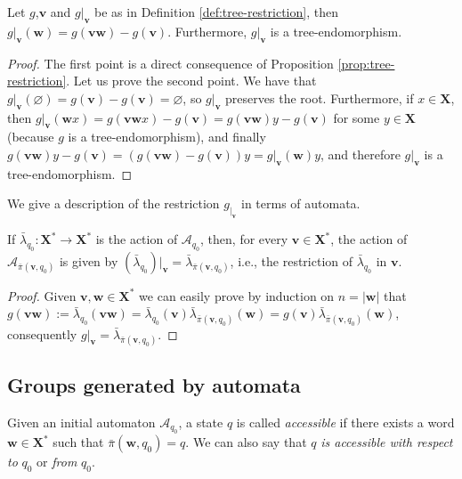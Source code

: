 \documentclass[mat1]{fmfdeloTS2.0}
\newcommand{\word}{\mathbf}				%
\newcommand{\abece}{\mathbf{X}}			%
\newcommand{\fslovar}{\mathbf{X^*}}		%
\newcommand{\auto}{\mathcal}			%
\newcommand{\PI}{\bar{\pi}}			%
\newcommand{\LAMBDA}{\bar{\lambda}}			%
\begin{document}
\begin{proposition}
Let $g$,$\word{v}$ and $g|_{\word{v}}$ be as in Definition \autoref{def:tree-restriction}, then $g|_{\word{v}}(\word{w})=g(\word{vw})-g(\word{v})$. Furthermore, $g|_{\word{v}}$ is a tree-endomorphism.
\end{proposition}
\begin{proof}
The first point is a direct consequence of Proposition \autoref{prop:tree-restriction}. Let us prove the second point. We have that $g|_{\word{v}}(\varnothing)=g(\word{v})-g(\word{v})=\varnothing$, so $g|_{\word{v}}$ preserves the root. Furthermore, if $x\in\abece$, then $g|_{\word{v}}(\word{w}x)=g(\word{vw}x)-g(\word{v})=g(\word{vw})y-g(\word{v})$ for some $y\in\abece$ (because $g$ is a tree-endomorphism), and finally $g(\word{vw})y-g(\word{v})=(g(\word{vw})-g(\word{v}))y=g|_{\word{v}}(\word{w})y$, and therefore $g|_{\word{v}}$ is a tree-endomorphism.
\end{proof}

We give a description of the restriction $g_{|_\word{v}}$ in terms of automata.

\begin{proposition}
If $\LAMBDA_{q_0}:\fslovar\longrightarrow\fslovar$ is the action of $\auto{A}_{q_0}$, then, for every $\word{v}\in\fslovar$, the action of $\auto{A}_{\PI(\word{v},q_0)}$ is given by $(\LAMBDA_{q_0})|_{\word{v}}=\LAMBDA_{\PI(\word{v},q_0)}$, i.e., the restriction of $\LAMBDA_{q_0}$ in $\word{v}$.
\label{prop:restr on automata}
\end{proposition}
\begin{proof}
Given $\word{v},\word{w}\in\fslovar$ we can easily prove by induction on $n=|\word{w}|$ that $g(\word{vw}):=\LAMBDA_{q_0}(\word{vw})=\LAMBDA_{q_0}(\word{v})\LAMBDA_{\PI(\word{v},q_0)}(\word{w})=g(\word{v})\LAMBDA_{\PI(\word{v},q_0)}(\word{w})$, consequently $g|_\word{v}=\LAMBDA_{\PI(\word{v},q_0)}$.
\end{proof}

\smallskip
\subsection{Groups generated by automata}

\begin{definition}
Given an initial automaton $\auto{A}_{q_0}$, a state $q$ is called \emph{accessible} if there exists a word $\word{w}\in\fslovar$ such that $\PI(\word{w},q_0)=q$. We can also say that $q$ \emph{ is accessible with respect to} $q_0$ or \emph{from} $q_0$.
\end{definition}
\end{document}
